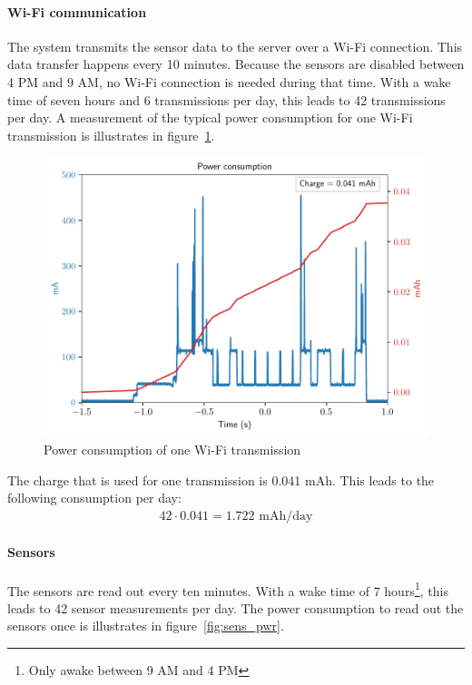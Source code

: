 \documentclass[11pt,a4paper]{article}
\begin{document}
\paragraph{Wi-Fi communication}
The system transmits the sensor data to the server over a Wi-Fi connection. This data transfer happens every 10 minutes. Because the sensors are disabled between 4 PM and 9 AM, no Wi-Fi connection is needed during that time. With a wake time of seven hours and 6 transmissions per day, this leads to 42 transmissions per day. A measurement of the typical power consumption for one Wi-Fi transmission is illustrates in figure~\ref{fig:wifipwr}.
\begin{figure}[!ht]
	\centering
	\includegraphics[width=1.0\linewidth]{wifi_pwr.pdf}
	\caption{Power consumption of one Wi-Fi transmission}
	\label{fig:wifipwr}
\end{figure}
The charge that is used for one transmission is 0.041 mAh. This leads to the following consumption per day:
\begin{gather*}
42 \cdot 0.041 = 1.722 \text{ mAh/day}
\end{gather*}

\paragraph{Sensors}
The sensors are read out every ten minutes. With a wake time of 7 hours\footnote{Only awake between 9 AM and 4 PM}, this leads to 42 sensor measurements per day. The power consumption to read out the sensors once is illustrates in figure~\ref{fig:sens_pwr}.
\end{document}
